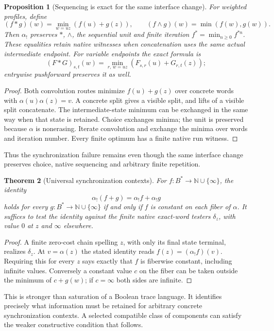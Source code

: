 \documentclass[11pt]{article}
\newtheorem{theorem}{Theorem}[section]
\newtheorem{proposition}[theorem]{Proposition}
\theoremstyle{definition}\newtheorem{definition}[theorem]{Definition}
\theoremstyle{remark}\newtheorem{remark}[theorem]{Remark}
\newcommand{\Cost}{\mathbb N\cup\{\infty\}}
\begin{document}
\begin{proposition}[Sequencing is exact for the same interface change]
For weighted profiles, define
\[
 (f*g)(w)=\min_{w=uz}(f(u)+g(z)),\qquad
 (f\wedge g)(w)=\min(f(w),g(w)).
\]
Then $\alpha_!$ preserves $*$, $\wedge$, the sequential unit and
finite iteration $f^*=\min_{n\geq0}f^{*n}$.
These equalities retain native witnesses when concatenation uses the same
actual intermediate endpoint. For variable endpoints the exact formula is
\[
 (F*G)_{s,t}(w)=\min_{r,\,w=uz}
                      (F_{s,r}(u)+G_{r,t}(z));
\]
entrywise pushforward preserves it as well.
\end{proposition}
\begin{proof}
Both convolution routes minimize $f(u)+g(z)$ over concrete words with
$\alpha(u)\alpha(z)=v$. A concrete split gives a visible split,
and lifts of a visible split concatenate. The intermediate-state minimum
can be exchanged in the same way when that state is retained. Choice
exchanges minima; the unit is preserved because $\alpha$ is nonerasing.
Iterate convolution and exchange the minima over words and iteration
number. Every finite optimum has a finite native run witness.
\end{proof}
Thus the synchronization failure remains even though the same interface
change preserves choice, native sequencing and arbitrary finite repetition.

\begin{theorem}[Universal synchronization contexts]\label{thm:universal-native}
For $f:B^*\to\Cost$, the identity
\[
 \alpha_!(f+g)=\alpha_!f+\alpha_!g
\]
holds for every $g:B^*\to\Cost$ if and only if $f$ is constant on
each fiber of $\alpha$. It suffices to test the identity against the
finite native exact-word testers $\delta_z$, with value $0$ at $z$
and $\infty$ elsewhere.
\end{theorem}
\begin{proof}
A finite zero-cost chain spelling $z$, with only its final state terminal,
realizes $\delta_z$. At $v=\alpha(z)$ the stated identity reads
$f(z)=(\alpha_!f)(v)$. Requiring this for every $z$ says exactly that
$f$ is fiberwise constant, including infinite values. Conversely a
constant value $c$ on the fiber can be taken outside the minimum of
$c+g(w)$; if $c=\infty$ both sides are infinite.
\end{proof}
This is stronger than saturation of a Boolean trace language. It identifies
precisely what information must be retained for arbitrary concrete
synchronization contexts. A selected compatible class of components can
satisfy the weaker constructive condition that follows.
\end{document}
